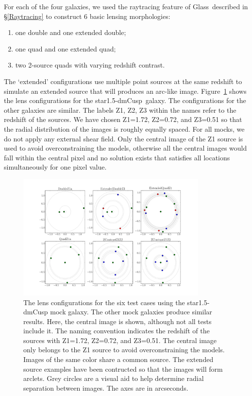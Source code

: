 \documentclass[galley,usenatbib]{mn2e}
\newcommand{\Glass}{{\sc Glass}}
\newcommand{\figref}[1] {Figure~\ref{#1}}
\newcommand{\secref}[1] {\S\ref{#1}}
\newcommand{\mockBC}{{\sc star1.5-dmCusp}}
\begin{document}
For each of the four galaxies, we used the raytracing feature of \Glass\
described in \secref{Raytracing} to construct 6 basic lensing morphologies:

\begin{enumerate}
\item one double and one extended double;
\item one quad and one extended quad;
\item two 2-source quads with varying redshift contrast.
\end{enumerate}
The `extended' configurations use multiple point sources at the same redshift
to simulate an extended source that will produces an arc-like image.
\figref{arrival surfaces} shows the lens configurations for the \mockBC\
galaxy. 
The configurations for the other galaxies are similar.  The labels Z1, Z2, Z3
within the names refer to the redshift of the sources. We have chosen Z1=1.72,
Z2=0.72, and Z3=0.51 so that the radial distribution of the images is roughly
equally spaced. For all mocks, we do not apply any external shear field.  Only
the central image of the Z1 source is used to avoid overconstraining the
models, otherwise all the central images would fall within the central pixel
and no solution exists that satisfies all locations simultaneously for one
pixel value.

\begin{figure}
\includegraphics[width=0.85\textwidth]{BCarrival_surfaces}
\caption{The lens configurations for the six test cases using the \mockBC{}
mock galaxy. The other mock galaxies produce similar results. Here, the central
image is shown, although not all tests include it. The naming convention
indicates the redshift of the sources with Z1=1.72, Z2=0.72, and Z3=0.51.  The
central image only belongs to the Z1 source to avoid overconstraining the
models. Images of the same color share a common source. The extended source examples have been
contructed so that the images will form arclets.
Grey circles are a visual aid
to help determine radial separation between images. The axes are in
arcseconds.}
\label{arrival surfaces}
\end{figure}
\end{document}
